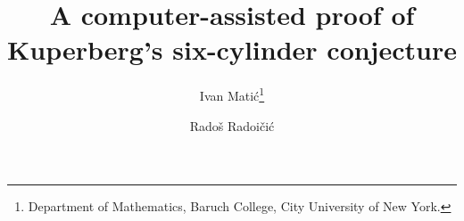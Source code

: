 \documentclass[10pt]{article}
\theoremstyle{definition}
\begin{document}
\title{A computer-assisted proof of Kuperberg's six-cylinder conjecture}
\author{Ivan Mati\'c\thanks{Department of Mathematics, Baruch College,
City University of New York.}
\and Rado\v{s} Radoi\v{c}i\'c\footnotemark[1]}
 
  
\end{document}

